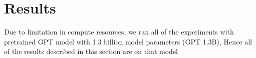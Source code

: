 \documentclass[11pt]{article}
\begin{document}
\section{Results}
Due to limitation in compute resources, we ran all of the experiments with pretrained GPT model with 1.3 billion model parameters (GPT 1.3B), Hence all of the results described in this section are on that model
\begin{table}[t]


\end{table}
\end{document}
